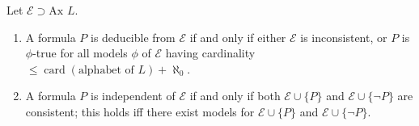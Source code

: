 Let $\mathcal{E} \supset \text{Ax } L$.
\begin{enumerate}
\item[(a)] A formula $P$ is deducible from $\mathcal{E}$ if and only if either $\mathcal{E}$ is inconsistent, or $P$ is $\phi$-true for all models $\phi$ of $\mathcal{E}$ having cardinality $\leqslant \operatorname{card}(\text{alphabet of } L) + \aleph_0$.
\item[(b)] A formula $P$ is independent of $\mathcal{E}$ if and only if both $\mathcal{E} \cup \{P\}$ and $\mathcal{E} \cup \{\neg P\}$ are consistent; this holds iff there exist models for $\mathcal{E} \cup \{P\}$ and $\mathcal{E} \cup \{\neg P\}$.
\end{enumerate}
